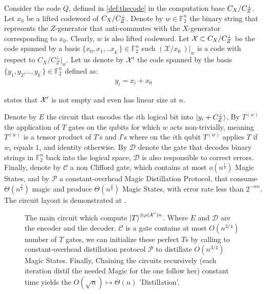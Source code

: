 \begin{definition}
  \label{def:subcode}  
  Consider the code $Q$, defined in \cref{def:thecode} in the computation base $C_{X}/C_{Z}^\perp$. Let $x_{0}$ be a lifted codeword  of $C_{X}/C_{Z}^\perp$. Denote by $w \in \mathbb{F}_{2}^{n}$ the binary string that represents the $Z$-generator that anti-commutes with the $X$-generator corresponding to $x_{0}$. Clearly, $w$ is also lifted codeword. Let $\mathcal{X} \subset C_{X}/C_{Z}^\perp $ be the code spanned by a basis $ \{x_{0}, x_{1}, .. x_{k^\prime}\} \in \mathbb{F}_{2}^{n}$ such $\left( \mathcal{X}/x_0 \ \right)|_{w}$ is a \trig code with respect to $C_{X}/C_{Z}^{\perp}|_{w}$. Let us denote by $\mathcal{X}^\prime$ the code spanned by the basis $\{ y_{1}, y_{2}, .., y_{k^\prime} \} \in \mathbb{F}_{2}^{n}$ defined as: \begin{equation*}
    \begin{split}
 y_{i} = x_{i} + x_{0}
    \end{split}
  \end{equation*}
\end{definition}

  states that $\mathcal{X}^\prime$ is not empty and even has linear size at $n$.


 \begin{definition}
   \label{def:gates} 
   Denote by $E$ the circuit that encodes the $i$th logical bit into $\ket{y_{i}+C_{Z}^{\perp}}$, By $T^{(w)}$ the application of $T$ gates on the qubits for which $w$ acts non-trivially, meaning $T^{(w)}$ is a tensor product of $T$'s and $I$'s where on the $i$th qubit $T^{(w)}$ applies $T$ if $w_{i}$ equals $1$, and identity otherwise. By $\mathcal{D}$ denote the gate that decodes binary strings in $\mathbb{F}_{2}^{n}$ back into the logical space, $\mathcal{D}$ is also responsible to correct errors.
   Finally, denote by $\mathcal{C}$ a non Clifford gate, which contains at most $o(n^{\frac{1}{4}})$ Magic States, and by $\mathcal{P}$ a constant-overhead  Magic Distillation Protocol, that consume $\Theta( n^{\frac{3}{4}}  )$ magic and produce $\Theta( n^{\frac{3}{4}})$ Magic States, with error rate less than $2^{-\alpha n}$. The circuit layout is demonstrated at .     
 \end{definition}
\begin{figure}
  \noindent %
  \scalebox{1.7}{ 
  
}
\caption{ The main circuit which compute $\ket{T}^{\otimes \rho(\mathcal{X}^\prime)n}$. Where $E$ and $\mathcal{D}$ are the encoder and the decoder. $\mathcal{C}$ is a gate contains at most $O(n^{3/4})$ number of $T$ gates, we can initialize these perfect $T$s by calling to constant-overhead distillation protocol $\mathcal{P}$ to distillate $O(n^{3/4})$ Magic States. Finally, Chaining the circuits recursively (each iteration distil the needed Magic for the one follow her) constant time yields the $O(\sqrt{n}) \mapsto \Theta(n)$ 'Distillation'. }
  \label{fig:circ}
\end{figure}

